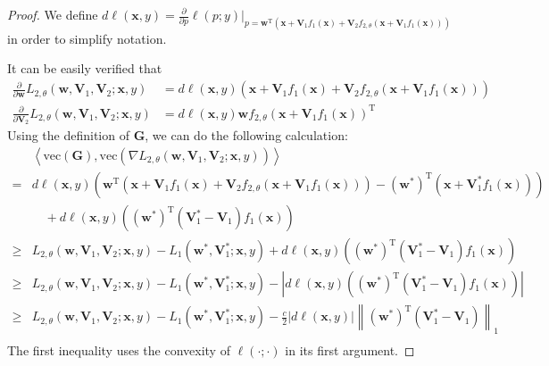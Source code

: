 \documentclass{article}
\theoremstyle{plain}
\theoremstyle{definition}
\newcommand{\norm}[1]{\left\lVert#1\right\rVert}
\newcommand{\abs}[1]{\left|#1\right|}
\newcommand{\dis}{\displaystyle}
\newcommand{\iprod}[2]{\left\langle #1,#2 \right\rangle}
\begin{document}
\begin{proof}
	We define $d\ell(\mathbf{x},y)=\dis\frac{\partial}{\partial p}\ell(p;y)
    \bigg|_{p=\mathbf{w}^\mathrm{T}(\mathbf{x}+\mathbf{V}_1f_1(\mathbf{x})+\mathbf{V}_2f_{2,\theta}(\mathbf{x}+\mathbf{V}_1f_1(\mathbf{x})))}$ in order to simplify notation.

	It can be easily verified that
	\begin{align*}
	\frac{\partial}{\partial\mathbf{w}}L_{2,\theta}(\mathbf{w},\mathbf{V}_1,\mathbf{V}_2;\mathbf{x},y)&=d\ell(\mathbf{x},y)(\mathbf{x}+\mathbf{V}_1f_1(\mathbf{x})+\mathbf{V}_2f_{2,\theta}(\mathbf{x}+\mathbf{V}_1f_1(\mathbf{x})))\\
        \frac{\partial}{\partial\mathbf{V}_2}L_{2,\theta}(\mathbf{w},\mathbf{V}_1,\mathbf{V}_2;\mathbf{x},y)&=d\ell(\mathbf{x},y)\mathbf{w}f_{2,\theta}(\mathbf{x}+\mathbf{V}_1f_1(\mathbf{x}))^\mathrm{T}
	\end{align*}
	Using the definition of $\mathbf{G}$, we can do the following calculation:
	\begin{align*}
	&\iprod{\text{vec}(\mathbf{G})}{\text{vec}\left(\nabla L_{2,\theta}(\mathbf{w},\mathbf{V}_1,\mathbf{V}_2;\mathbf{x},y)\right)}\\
        =&d\ell(\mathbf{x},y)\left(\mathbf{w}^\mathrm{T}(\mathbf{x}+\mathbf{V}_1f_1(\mathbf{x})+\mathbf{V}_2f_{2,\theta}(\mathbf{x}+\mathbf{V}_1f_1(\mathbf{x})))-\left(\mathbf{w}^*\right)^\mathrm{T}(\mathbf{x}+\mathbf{V}_1^*f_1(\mathbf{x}))\right)\\
        &\quad +d\ell(\mathbf{x},y)\left(\left(\mathbf{w}^*\right)^\mathrm{T}\left(\mathbf{V}_1^*-\mathbf{V}_1\right)f_1(\mathbf{x})\right)\\
	\geq &L_{2,\theta}(\mathbf{w},\mathbf{V}_1,\mathbf{V}_2;\mathbf{x},y)-L_1(\mathbf{w}^*,\mathbf{V}_1^*;\mathbf{x},y)
        +d\ell(\mathbf{x},y)\left(\left(\mathbf{w}^*\right)^\mathrm{T}\left(\mathbf{V}_1^*-\mathbf{V}_1\right)f_1(\mathbf{x})\right)\\
	\geq &L_{2,\theta}(\mathbf{w},\mathbf{V}_1,\mathbf{V}_2;\mathbf{x},y)-L_1(\mathbf{w}^*,\mathbf{V}_1^*;\mathbf{x},y)
        -\abs{d\ell(\mathbf{x},y)\left(\left(\mathbf{w}^*\right)^\mathrm{T}\left(\mathbf{V}_1^*-\mathbf{V}_1\right)f_1(\mathbf{x})\right)}\\
	\geq &L_{2,\theta}(\mathbf{w},\mathbf{V}_1,\mathbf{V}_2;\mathbf{x},y)-L_1(\mathbf{w}^*,\mathbf{V}_1^*;\mathbf{x},y)
        -\frac c 2\abs{d\ell(\mathbf{x},y)}\norm{\left(\mathbf{w}^*\right)^\mathrm{T}\left(\mathbf{V}_1^*-\mathbf{V}_1\right)}_1\\
	\end{align*}
	The first inequality uses the convexity of $\ell(\cdot;\cdot)$ in its first argument.


\end{proof}
\end{document}
